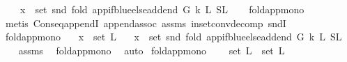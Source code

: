 \begin{isabellebody}
\ \ \ {\isachardoublequoteopen}\ x\ {\isasymin}\ set\ {\isacharparenleft}{\kern0pt}snd\ {\isacharparenleft}{\kern0pt}fold\ {\isacharparenleft}{\kern0pt}app{\isacharunderscore}{\kern0pt}if{\isacharunderscore}{\kern0pt}blue{\isacharunderscore}{\kern0pt}else{\isacharunderscore}{\kern0pt}add{\isacharunderscore}{\kern0pt}end\ G\ k{\isacharparenright}{\kern0pt}\ L{}\ {\isacharparenleft}{\kern0pt}S{}{\isacharcomma}{\kern0pt}L{}{\isacharparenright}{\kern0pt}{\isacharparenright}{\kern0pt}{\isacharparenright}{\kern0pt}{\isachardoublequoteclose}\isanewline
%
\isadelimproof
\ \ %
\endisadelimproof
%
\isatagproof
{}\isamarkupfalse%
\ fold{\isacharunderscore}{\kern0pt}app{\isacharunderscore}{\kern0pt}mono\isanewline
\ \ \isamarkupfalse%
\ {\isacharparenleft}{\kern0pt}metis\ Cons{\isacharunderscore}{\kern0pt}eq{\isacharunderscore}{\kern0pt}appendI\ append{\isachardot}{\kern0pt}assoc\ assms\ in{\isacharunderscore}{\kern0pt}set{\isacharunderscore}{\kern0pt}conv{\isacharunderscore}{\kern0pt}decomp\ sndI{\isacharparenright}{\kern0pt}%
\endisatagproof
{\isafoldproof}%
%
\isadelimproof
\ \isanewline
%
\endisadelimproof
\isanewline
{}\isamarkupfalse%
\ fold{\isacharunderscore}{\kern0pt}app{\isacharunderscore}{\kern0pt}mono{}{\isacharcolon}{\kern0pt}\isanewline
\ \ \ {\isachardoublequoteopen}x\ {\isasymin}\ set\ L{}{\isachardoublequoteclose}\isanewline
\ \ \ {\isachardoublequoteopen}x\ {\isasymin}\ set\ {\isacharparenleft}{\kern0pt}snd\ {\isacharparenleft}{\kern0pt}fold\ {\isacharparenleft}{\kern0pt}app{\isacharunderscore}{\kern0pt}if{\isacharunderscore}{\kern0pt}blue{\isacharunderscore}{\kern0pt}else{\isacharunderscore}{\kern0pt}add{\isacharunderscore}{\kern0pt}end\ G\ k{\isacharparenright}{\kern0pt}\ L{}\ {\isacharparenleft}{\kern0pt}S{\isacharcomma}{\kern0pt}L{}{\isacharparenright}{\kern0pt}{\isacharparenright}{\kern0pt}{\isacharparenright}{\kern0pt}{\isachardoublequoteclose}\ \isanewline
%
\isadelimproof
\ \ %
\endisadelimproof
%
\isatagproof
{}\isamarkupfalse%
\ assms\ \isamarkupfalse%
\ fold{\isacharunderscore}{\kern0pt}app{\isacharunderscore}{\kern0pt}mono\ \isamarkupfalse%
\ auto%
\endisatagproof
{\isafoldproof}%
%
\isadelimproof
\isanewline
%
\endisadelimproof
\isanewline
{}\isamarkupfalse%
\ fold{\isacharunderscore}{\kern0pt}app{\isacharunderscore}{\kern0pt}mono{}{\isacharcolon}{\kern0pt}\ \isanewline
\ \ \ {\isachardoublequoteopen}set\ L{}\ {\isasymsubseteq}\ set\ L{}{\isachardoublequoteclose}\isanewline

\end{isabellebody}
